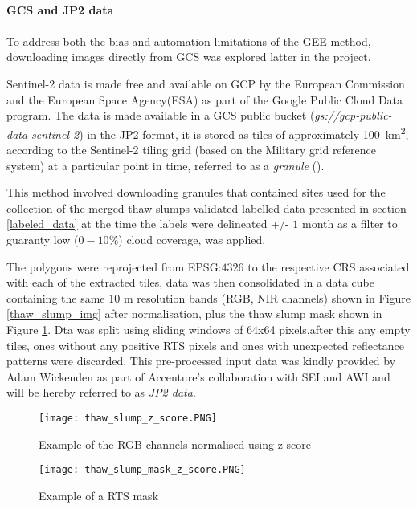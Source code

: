 \paragraph{\gls{GCS} and \gls{JP2} data}
\paragraph{}
To address both the bias and automation limitations of the \gls{GEE} method, downloading images directly from \gls{GCS} was explored latter in the project.

Sentinel-2 data is made free and available on \gls{GCP} by the European Commission and the European Space Agency(ESA) as part of the Google Public Cloud Data program. The data is made available in a \gls{GCS} public bucket (\textit{gs://gcp-public-data-sentinel-2}) in the \gls{JP2} format, it is stored as tiles of approximately \SI{100}{\kilo\metre\squared}, according to the Sentinel-2 tiling grid (based on the Military grid reference system) at a particular point in time, referred to as a \textit{granule} (\cite{sentinel2_gcp}).

This method involved downloading granules that contained sites used for the collection of the merged thaw slumps validated labelled data presented in section \ref{labeled_data} at the time the labels were delineated +/- $1$ month as a filter to guaranty low ($0-10\%$) cloud coverage, was applied.

The polygons were reprojected from \gls{EPSG}:$4326$ to the respective \gls{CRS} associated with each of the extracted tiles, data was then consolidated in a data cube containing the same 10 m resolution bands (\gls{RGB}, \gls{NIR} channels)  shown in Figure \ref{thaw_slump_img} after normalisation, plus the thaw slump mask shown in Figure \ref{thaw_slump_mask}. Dta was split using sliding windows of 64x64 pixels,after this any empty tiles, ones without any positive \gls{RTS} pixels and ones with unexpected reflectance patterns were discarded. This pre-processed input data was kindly provided by Adam Wickenden as part of Accenture's collaboration  with \gls{SEI} and \gls{AWI} and will be hereby referred to as \textit{\gls{JP2} data}.


\begin{figure}[hbt!]
    \begin{minipage}[c]{0.45\linewidth}
        \texttt{[image: thaw\_slump\_z\_score.PNG]}
        \caption{Example of the \gls{RGB} channels normalised using z-score}
        \label{thaw_slump_img}        
        \end{minipage}
        \hfill
        \begin{minipage}[c]{0.45\linewidth}
        \texttt{[image: thaw\_slump\_mask\_z\_score.PNG]}
        \caption{Example of a \gls{RTS} mask}
        \label{thaw_slump_mask}
    \end{minipage}
\end{figure}
